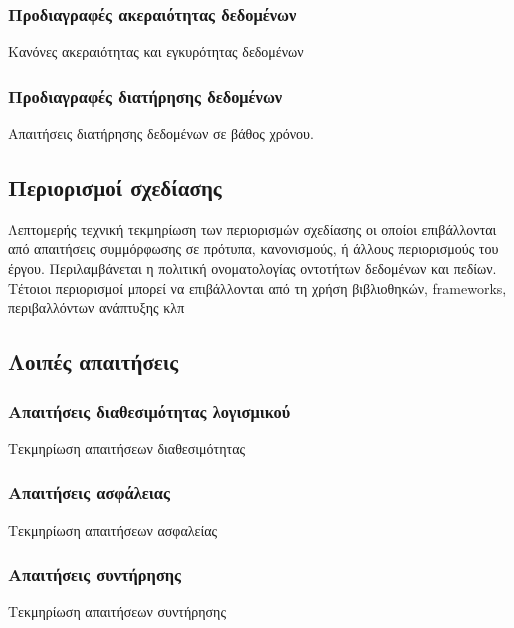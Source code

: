 \subsubsection{Προδιαγραφές ακεραιότητας δεδομένων}
Κανόνες ακεραιότητας και εγκυρότητας δεδομένων
\subsubsection{Προδιαγραφές διατήρησης δεδομένων}
Απαιτήσεις διατήρησης δεδομένων σε βάθος χρόνου.
\subsection{Περιορισμοί σχεδίασης}
Λεπτομερής τεχνική τεκμηρίωση των περιορισμών σχεδίασης οι οποίοι επιβάλλονται από απαιτήσεις
συμμόρφωσης σε πρότυπα, κανονισμούς, ή άλλους περιορισμούς του έργου. Περιλαμβάνεται η πολιτική
ονοματολογίας οντοτήτων δεδομένων και πεδίων. Τέτοιοι περιορισμοί μπορεί να επιβάλλονται από τη χρήση
βιβλιοθηκών, frameworks, περιβαλλόντων ανάπτυξης κλπ
\subsection{Λοιπές απαιτήσεις}
\subsubsection{Απαιτήσεις διαθεσιμότητας λογισμικού}
Τεκμηρίωση απαιτήσεων διαθεσιμότητας
\subsubsection{Απαιτήσεις ασφάλειας}
Τεκμηρίωση απαιτήσεων ασφαλείας
\subsubsection{Απαιτήσεις συντήρησης}
Τεκμηρίωση απαιτήσεων συντήρησης